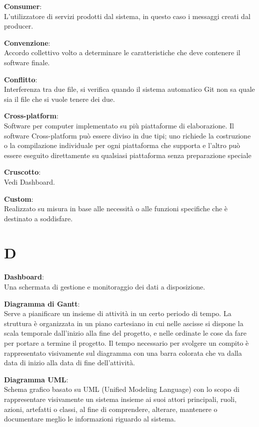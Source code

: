 \documentclass[a4paper, oneside, openany, dvipsnames, table]{article}
\begin{document}
\textbf{Consumer}:\\ L'utilizzatore di servizi prodotti dal sistema, in questo caso i messaggi creati dal producer.

\textbf{Convenzione}:\\	Accordo collettivo volto a determinare le caratteristiche che deve contenere il software finale.

\textbf{Conflitto}:\\	Interferenza tra due file, si verifica quando il sistema automatico Git non sa quale sia il file che si vuole tenere dei due.

\textbf{Cross-platform}:\\	 Software per computer implementato su più piattaforme di elaborazione. Il software Cross-platform può essere diviso in due tipi; uno richiede la costruzione o la compilazione individuale per ogni piattaforma che supporta e l'altro può essere eseguito direttamente su qualsiasi piattaforma senza preparazione speciale

\textbf{Cruscotto}:\\ Vedi Dashboard.

\textbf{Custom}:\\	Realizzato su misura in base alle necessità o alle funzioni specifiche che è destinato a soddisfare.	


\newpage
\section{D}
\textbf{Dashboard}:	\\ Una schermata di gestione e monitoraggio dei dati a disposizione.

\textbf{Diagramma di Gantt}:\\	Serve a pianificare un insieme di attività in un certo periodo di tempo. La struttura è organizzata in un piano cartesiano in cui nelle ascisse si dispone la scala temporale dall’inizio alla fine del progetto, e nelle ordinate le cose da fare per portare a termine il progetto. Il tempo necessario per svolgere un compito è rappresentato visivamente sul diagramma con una barra colorata che va dalla data di inizio alla data di fine dell’attività.

\textbf{Diagramma UML}:\\ Schema grafico basato su UML (Unified Modeling Language) con lo scopo di rappresentare visivamente un sistema insieme ai suoi attori principali, ruoli, azioni, artefatti o classi, al fine di comprendere, alterare, mantenere o documentare meglio le informazioni riguardo al sistema.
\end{document}
